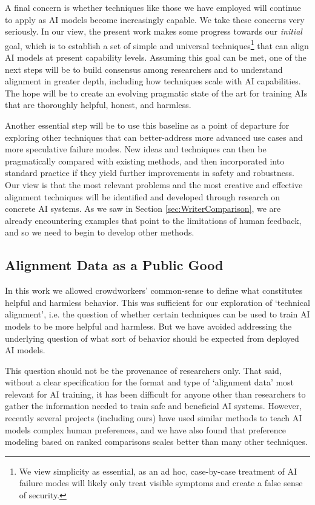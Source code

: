 A final concern is whether techniques like those we have employed will continue to apply as AI models become increasingly capable.  We take these concerns very seriously.  In our view, the present work makes some progress towards our \emph{initial} goal, which is to establish a set of simple and universal techniques\footnote{We view simplicity as essential, as an ad hoc, case-by-case treatment of AI failure modes will likely only treat visible symptoms and create a false sense of security.} that can align AI models at present capability levels.   Assuming this goal can be met, one of the next steps will be to build consensus among researchers and to understand alignment in greater depth, including how techniques scale with AI capabilities.  The hope will be to create an evolving pragmatic state of the art for training AIs that are thoroughly helpful, honest, and harmless. 

Another  essential  step will be to use this baseline as a point of departure for exploring other techniques that can better-address more advanced use cases and more speculative failure modes.    New ideas and techniques can then be pragmatically compared with existing methods, and then incorporated into standard practice if they yield further improvements in safety and robustness.  Our view is that the most relevant problems and the most creative and effective alignment techniques will be identified and developed through research on concrete AI systems.  As we saw in Section \ref{sec:WriterComparison}, we are already encountering examples that point to the limitations of human feedback, and so we need to begin to develop other methods. 

\subsection{Alignment Data as a Public Good}

In this work we allowed crowdworkers' common-sense to define what constitutes helpful and harmless behavior.  This was sufficient for our exploration of `technical alignment', i.e. the question of whether certain techniques can be used to train AI models to be more helpful and harmless.  But we have avoided addressing the underlying question of what sort of behavior should be expected from deployed AI models.  

This question should not be the provenance of researchers only.  That said, without a clear specification for the format and type of `alignment data' most relevant for AI training, it has been difficult for anyone other than researchers to gather the information needed to train safe and beneficial AI systems.  However, recently several projects (including ours) have used similar  methods  \cite{stiennon2020learning, InstructGPT, WebGPT} to teach AI models complex human preferences, and we have also found \cite{askell2021general} that  preference modeling based on ranked comparisons scales better than many other techniques.  

